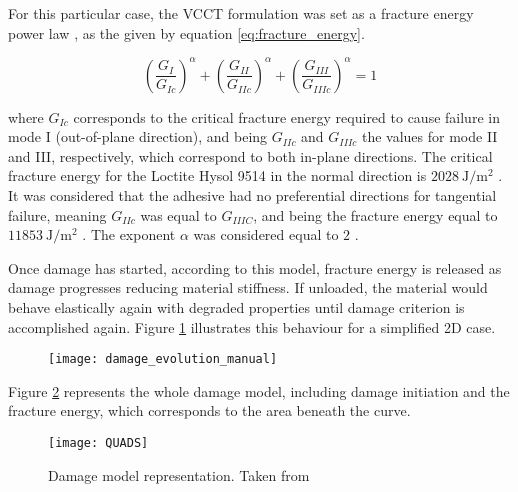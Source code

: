 For this particular case, the \gls{VCCT} formulation was set as a fracture energy power law \citep{Loureiro2010, Sadowski2010, Sadowski2011, Sadowski2014, SernaMoreno2015}, as the given by equation \ref{eq:fracture_energy}.

\begin{equation}
\left(\frac{G_{I}}{G_{Ic}}\right)^{\alpha}+\left(\frac{G_{II}}{G_{IIc}}\right)^{\alpha}+\left(\frac{G_{III}}{G_{IIIc}}\right)^{\alpha}=1
\label{eq:fracture_energy}
\end{equation}

where $G_{Ic}$ corresponds to the critical fracture energy required to cause failure in mode I (out-of-plane direction), and being $G_{IIc}$ and $G_{IIIc}$ the values for mode II and III, respectively, which correspond to both in-plane directions. The critical fracture energy for the Loctite Hysol 9514 in the normal direction is $\SI{2028}{\J/\m^2}$ \citep{Scattina2011}. It was considered that the adhesive had no preferential directions for tangential failure, meaning $G_{IIc}$ was equal to $G_{IIIC}$, and being the fracture energy equal to $\SI{11853}{\J/\m^2}$ \citep{Scattina2011}. The exponent $\alpha$ was considered equal to $\num{2}$ \citep{Loureiro2010, Sadowski2010, Sadowski2011, Sadowski2014, SernaMoreno2015}.

Once damage has started, according to this model, fracture energy is released as damage progresses reducing material stiffness. If unloaded, the material would behave elastically again with degraded properties until damage criterion is accomplished again. Figure \ref{fig:damage_evo2D} illustrates this behaviour for a simplified 2D case.

\begin{figure}
\centering
\texttt{[image: damage\_evolution\_manual]}
\label{fig:damage_evo2D}
\end{figure}

Figure \ref{fig:damage} represents the whole damage model, including damage initiation and the fracture energy, which corresponds to the area beneath the curve.

\begin{figure}
\centering
\texttt{[image: QUADS]}
\caption{Damage model representation. Taken from \citep{Sadowski2010}}
\label{fig:damage}
\end{figure}

